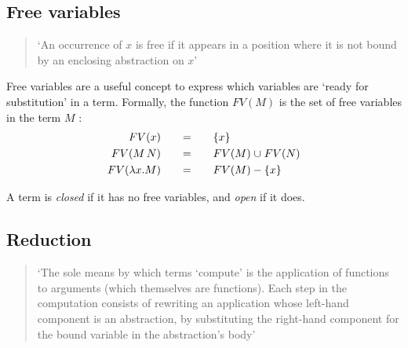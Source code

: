 \subsection{Free variables}
\begin{quotation}
\noindent`An occurrence of $x$ is free if it appears in a position where it is not bound by an enclosing abstraction on $x$' \cite{pierce2002types}
\end{quotation}

\noindent Free variables are a useful concept to express which variables are `ready for substitution' in a term. Formally, the function $FV(M)$ is the set of free variables in the term $M$ \cite{barendregt2013lambda}:
\begin{alignat*}{3}
FV(x)              \quad && = \quad && &\{x\}               \\
FV(M\,N)           \quad && = \quad && &FV(M)\mathrel{\cup} FV(N)   \\
FV(\lambda x. M)   \quad && = \quad && &FV(M)-\{x\}         \\
\end{alignat*}

\noindent A term is \textit{closed} if it has no free variables, and \textit{open} if it does. 

\subsection{Reduction}
\begin{quotation}
\noindent`The sole means by which terms `compute' is the application of functions to arguments (which themselves are functions). Each step in the computation consists of rewriting an application whose left-hand component is an abstraction, by substituting the right-hand component for the bound variable in the abstraction's body' \cite{pierce2002types} 
\end{quotation}

